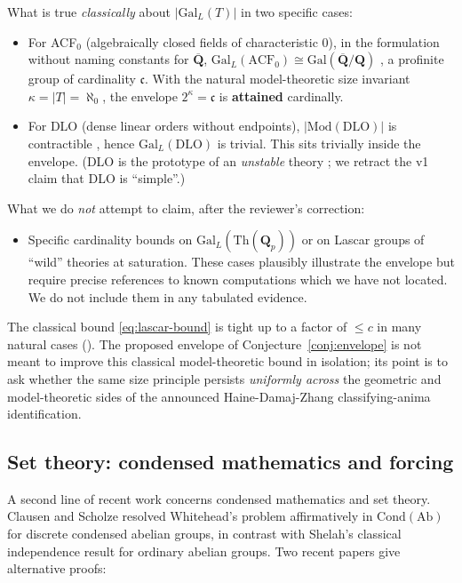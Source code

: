 \documentclass[11pt]{article}
\theoremstyle{definition}
\theoremstyle{plain}
\theoremstyle{remark}
\newcommand{\Cond}{\mathrm{Cond}}
\newcommand{\GalL}{\mathrm{Gal}_{L}}
\newcommand{\Galabs}{\mathrm{Gal}}
\newcommand{\Q}{\mathbf{Q}}
\newcommand{\continuum}{\mathfrak{c}}
\begin{document}
What is true \emph{classically} about $|\GalL(T)|$ in two specific cases:

\begin{itemize}
\item For ACF$_0$ (algebraically closed fields of characteristic $0$), in
the formulation without naming constants for $\overline{\Q}$,
$\GalL(\mathrm{ACF}_0) \cong \Galabs(\overline{\Q}/\Q)$
\cite[Example 4.8]{CampionCousinsYe2021}, a profinite group of cardinality
$\continuum$. With the natural model-theoretic size invariant
$\kappa = |T| = \aleph_0$, the envelope $2^{\kappa} = \continuum$ is
\textbf{attained} cardinally.
\item For DLO (dense linear orders without endpoints),
$|\mathrm{Mod}(\mathrm{DLO})|$ is contractible
\cite[Example 4.4]{CampionCousinsYe2021}, hence $\GalL(\mathrm{DLO})$ is
trivial. This sits trivially inside the envelope. (DLO is the prototype of
an \emph{unstable} theory \cite{nLab-DLO}; we retract the v1 claim that
DLO is ``simple''.)
\end{itemize}

What we do \emph{not} attempt to claim, after the reviewer's correction:

\begin{itemize}
\item Specific cardinality bounds on $\GalL(\mathrm{Th}(\Q_p))$ or
on Lascar groups of ``wild'' theories at saturation. These cases plausibly
illustrate the envelope but require precise references to known computations
which we have not located. We do not include them in any tabulated evidence.
\end{itemize}

The classical bound \eqref{eq:lascar-bound} is tight up to a factor of $\le c$
in many natural cases (\cite[\S 4]{CampionCousinsYe2021}). The proposed
envelope of Conjecture~\ref{conj:envelope} is not meant to improve this
classical model-theoretic bound in isolation; its point is to ask whether the
same size principle persists \emph{uniformly across} the geometric and
model-theoretic sides of the announced Haine-Damaj-Zhang classifying-anima
identification.

\subsection{Set theory: condensed mathematics and forcing}

A second line of recent work concerns condensed mathematics and set theory.
Clausen and Scholze \cite{ClausenScholze2019Lectures} resolved Whitehead's
problem affirmatively in $\Cond(\mathrm{Ab})$ for discrete condensed abelian
groups, in contrast with Shelah's classical independence result for ordinary
abelian groups. Two recent papers give alternative proofs:
\end{document}

